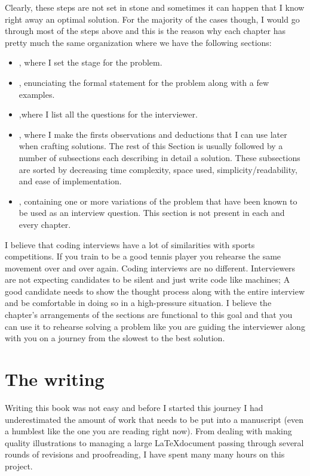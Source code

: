 Clearly, these steps are not set in stone and sometimes it can happen that I know right away an optimal solution. 
For the majority of the cases though, I would go through most of the steps above and this is the reason why each chapter has pretty much the same organization where we have the following sections:
\begin{itemize}
    \item \textit{}, where I set the stage for the problem.
    \item \textit{}, enunciating the formal statement for the problem along with a few examples.
    \item \textit{},where I list all the questions for the interviewer. 
    \item \textit{}, where I make the firsts observations and deductions that I can use later when crafting solutions. The rest of this Section is usually followed by a number of subsections each describing in detail a solution. These subsections are sorted by decreasing time complexity, space used, simplicity/readability, and ease of implementation. 
    \item \textit{}, containing one or more variations of the problem that have been known to be used as an interview question. This section is not present in each and every chapter.
 \end{itemize}

I believe that coding interviews have a lot of similarities with sports competitions. If you train to be a good tennis player you rehearse the same movement over and over again. Coding interviews are no different. 
Interviewers are not expecting candidates to be silent and just write code like machines; 
A good candidate needs to show the thought process along with the entire interview and be comfortable in doing so in a high-pressure situation. 
I believe the chapter's arrangements of the sections are functional to this goal and that you can use it to rehearse solving a problem like you are guiding the interviewer along with you on a journey from the slowest to the best solution. 


\section*{The writing}
Writing this book was not easy and before I started this journey I had underestimated the amount of work that needs to be put into a manuscript (even a humblest like the one you are reading right now). 
From dealing with making quality illustrations to managing a large \LaTeX document passing through several rounds of revisions and proofreading, I have spent many many hours on this project. 

